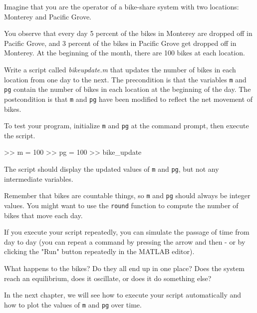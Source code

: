 \begin{ex}
\label{bikegame}

Imagine that you are the operator of a bike-share system with two
locations: Monterey and Pacific Grove.

You observe that every day 5 percent
of the bikes in Monterey are dropped off in Pacific Grove, and 3 percent of the bikes
in Pacific Grove get dropped off in Monterey.
At the beginning of the month, there are 100 bikes at each location.

Write a script called \emph{bike\textunderscore update.m} that updates the number
of bikes in each location from one day to the next.  The precondition
is that the variables \lstinline{m} and \lstinline{pg} contain the number of bikes
in each location at the beginning of the day.  The postcondition
is that \lstinline{m} and \lstinline{pg} have been modified to reflect the net movement of bikes.

To test your program, initialize \lstinline{m} and \lstinline{pg} at
the command prompt, then execute the script.  
\begin{code}
>> m = 100
>> pg = 100
>> bike_update
\end{code}

The script should display
the updated values of \lstinline{m} and \lstinline{pg}, but not any intermediate
variables.

Remember that bikes are countable things, so \lstinline{m} and \lstinline{pg} should always be integer values.  You might want to use the \lstinline{round} function
to compute the number of bikes that move each day.

If you execute your script repeatedly, you can simulate the passage
of time from day to day (you can repeat a command by pressing the  arrow and then  - or by clicking the "Run" button repeatedly in the MATLAB editor).

What happens to the bikes?  Do they all end up in one place?  Does the system reach an equilibrium, does it oscillate, or does it do something else?

In the next chapter, we will see how to execute your script automatically
and how to plot the values of \lstinline{m} and \lstinline{pg} over time.

\end{ex}
